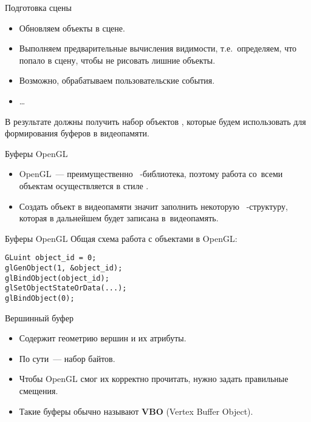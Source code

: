 \documentclass{beamer}
\begin{document}
\begin{frame}[fragile]{Подготовка сцены}
    \begin{itemize}
        \item Обновляем объекты в сцене.
        \item Выполняем предварительные вычисления видимости, 
            т.е.~определяем, что попало в сцену, чтобы не рисовать лишние объекты.
        \item Возможно, обрабатываем пользовательские события.
        \item \dots
    \end{itemize}
    В результате должны получить набор объектов \langcpp, 
        которые будем использовать для формирования буферов в видеопамяти.
\end{frame}

\begin{frame}[fragile]{Буферы OpenGL}
    \begin{itemize}
        \item OpenGL~--- преимущественно \langc~-библиотека, 
            поэтому работа со~всеми объектам осуществляется в стиле \langc.
        \item Создать объект в видеопамяти значит заполнить некоторую \langc~-структуру,
            которая в дальнейшем будет записана в~видеопамять.
    \end{itemize}
\end{frame}

\begin{frame}[fragile]{Буферы OpenGL}
    Общая схема работа с объектами в OpenGL:
        {\small \begin{lstlisting}
GLuint object_id = 0;
glGenObject(1, &object_id);
glBindObject(object_id);
glSetObjectStateOrData(...);
glBindObject(0);
        \end{lstlisting}}
\end{frame}

\begin{frame}[fragile]{Вершинный буфер}
    \begin{itemize}
        \item Содержит геометрию вершин и их атрибуты.
        \item По сути~--- набор байтов.
        \item Чтобы OpenGL смог их корректно прочитать, нужно задать правильные смещения.
        \item Такие буферы обычно называют {\bf VBO} (Vertex Buffer Object).
    \end{itemize}
\end{frame}
\end{document}
